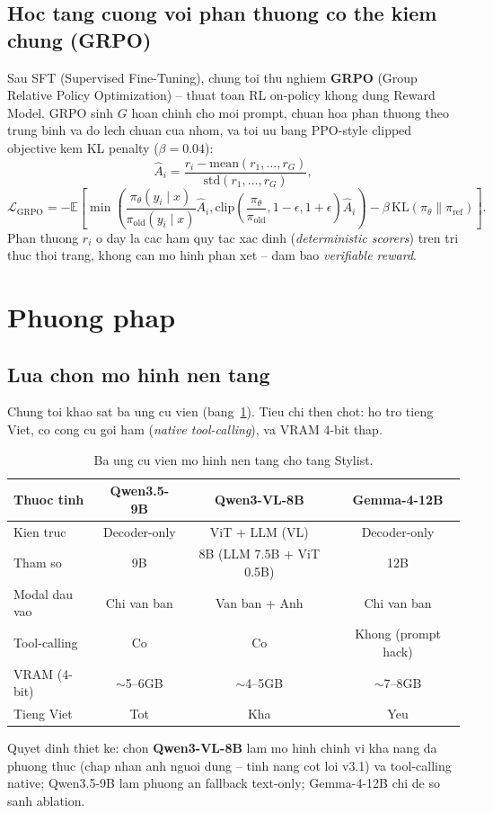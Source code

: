 \documentclass[12pt,a4paper]{article}
\begin{document}
\subsection{Hoc tang cuong voi phan thuong co the kiem chung (GRPO)}
Sau SFT (Supervised Fine-Tuning), chung toi thu nghiem \textbf{GRPO} (Group Relative Policy
Optimization) \cite{shao2024deepseekmath} -- thuat toan RL on-policy khong dung Reward Model.
GRPO sinh $G$ hoan chinh cho moi prompt, chuan hoa phan thuong theo trung binh va do lech
chuan cua nhom, va toi uu bang PPO-style clipped objective kem KL penalty ($\beta=0.04$):
\begin{equation}
  \hat{A}_i = \frac{r_i - \mathrm{mean}(r_1,\dots,r_G)}{\mathrm{std}(r_1,\dots,r_G)},
\end{equation}
\begin{equation}
  \mathcal{L}_{\text{GRPO}} = -\mathbb{E}\!\left[\min\!\left(
  \frac{\pi_\theta(y_i\mid x)}{\pi_{\text{old}}(y_i\mid x)}\hat{A}_i,
  \mathrm{clip}\!\left(\frac{\pi_\theta}{\pi_{\text{old}}},1-\epsilon,1+\epsilon\right)\hat{A}_i
  \right) - \beta\, \mathrm{KL}(\pi_\theta \| \pi_{\text{ref}})\right].
\end{equation}
Phan thuong $r_i$ o day la cac ham quy tac xac dinh (\emph{deterministic scorers}) tren tri
thuc thoi trang, khong can mo hinh phan xet -- dam bao \emph{verifiable reward}.
\section{Phuong phap}
\label{sec:method}
\subsection{Lua chon mo hinh nen tang}
Chung toi khao sat ba ung cu vien (bang~\ref{tab:models}). Tieu chi then chot: ho tro tieng
Viet, co cong cu goi ham (\emph{native tool-calling}), va VRAM 4-bit thap.
\begin{table}[H]
  \centering
  \caption{Ba ung cu vien mo hinh nen tang cho tang Stylist.}
  \label{tab:models}
  \begin{tabular}{lccc}
    \toprule
    \textbf{Thuoc tinh} & Qwen3.5-9B & Qwen3-VL-8B & Gemma-4-12B \\
    \midrule
    Kien truc & Decoder-only & ViT + LLM (VL) & Decoder-only \\
    Tham so & 9B & 8B (LLM 7.5B + ViT 0.5B) & 12B \\
    Modal dau vao & Chi van ban & Van ban + Anh & Chi van ban \\
    Tool-calling & Co & Co & Khong (prompt hack) \\
    VRAM (4-bit) & $\sim$5--6GB & $\sim$4--5GB & $\sim$7--8GB \\
    Tieng Viet & Tot & Kha & Yeu \\
    \bottomrule
  \end{tabular}
\end{table}
Quyet dinh thiet ke: chon \textbf{Qwen3-VL-8B} lam mo hinh chinh vi kha nang da phuong thuc
(chap nhan anh nguoi dung -- tinh nang cot loi v3.1) va tool-calling native; Qwen3.5-9B lam
phuong an fallback text-only; Gemma-4-12B chi de so sanh ablation.
\end{document}

